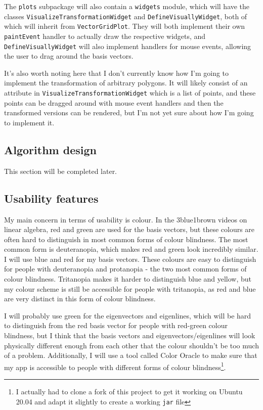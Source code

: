 \documentclass[../main.tex]{subfiles}
\begin{document}
The \texttt{plots} subpackage will also contain a \texttt{widgets} module, which will have the classes \texttt{VisualizeTransformationWidget} and \texttt{DefineVisuallyWidget}, both of which will inherit from \texttt{VectorGridPlot}. They will both implement their own \texttt{paintEvent} handler to actually draw the respective widgets, and \texttt{DefineVisuallyWidget} will also implement handlers for mouse events, allowing the user to drag around the basis vectors.

It's also worth noting here that I don't currently know how I'm going to implement the transformation of arbitrary polygons. It will likely consist of an attribute in \texttt{VisualizeTransformationWidget} which is a list of points, and these points can be dragged around with mouse event handlers and then the transformed versions can be rendered, but I'm not yet sure about how I'm going to implement it.

\subsection{Algorithm design\label{subsection:algorithm-design}}


This section will be completed later.

\subsection{Usability features\label{subsection:usability-features}}

My main concern in terms of usability is colour. In the 3blue1brown videos on linear algebra, red and green are used for the basis vectors, but these colours are often hard to distinguish in most common forms of colour blindness. The most common form is deuteranopia\cite{types-of-color-blindness}, which makes red and green look incredibly similar. I will use blue and red for my basis vectors. These colours are easy to distinguish for people with deuteranopia and protanopia - the two most common forms of colour blindness. Tritanopia makes it harder to distinguish blue and yellow, but my colour scheme is still be accessible for people with tritanopia, as red and blue are very distinct in this form of colour blindness.

I will probably use green for the eigenvectors and eigenlines, which will be hard to distinguish from the red basis vector for people with red-green colour blindness, but I think that the basis vectors and eigenvectors/eigenlines will look physically different enough from each other that the colour shouldn't be too much of a problem. Additionally, I will use a tool called Color Oracle\cite{colororacle.org} to make sure that my app is accessible to people with different forms of colour blindness\footnote{I actually had to clone a fork of this project\cite{color-oracle-dorkbox-fork} to get it working on Ubuntu 20.04 and adapt it slightly to create a working \texttt{jar} file}.
\end{document}
